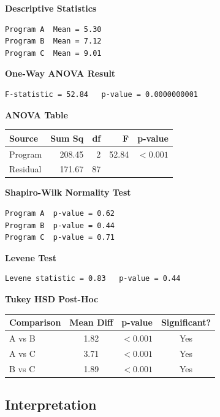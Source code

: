 \documentclass[12pt,a4paper]{article}
\begin{document}
\begin{outputbox}
\textbf{Descriptive Statistics}
\begin{verbatim}
Program A  Mean = 5.30
Program B  Mean = 7.12
Program C  Mean = 9.01
\end{verbatim}

\textbf{One-Way ANOVA Result}
\begin{verbatim}
F-statistic = 52.84   p-value = 0.0000000001
\end{verbatim}

\textbf{ANOVA Table}
\begin{center}
\begin{tabular}{lrrrr}
\toprule
Source   & Sum Sq & df & F     & p-value  \\
\midrule
Program  & 208.45 & 2  & 52.84 & $<0.001$ \\
Residual & 171.67 & 87 &       &          \\
\bottomrule
\end{tabular}
\end{center}

\textbf{Shapiro-Wilk Normality Test}
\begin{verbatim}
Program A  p-value = 0.62
Program B  p-value = 0.44
Program C  p-value = 0.71
\end{verbatim}

\textbf{Levene Test}
\begin{verbatim}
Levene statistic = 0.83   p-value = 0.44
\end{verbatim}

\textbf{Tukey HSD Post-Hoc}
\begin{center}
\begin{tabular}{lccc}
\toprule
Comparison & Mean Diff & p-value  & Significant? \\
\midrule
A vs B     & 1.82      & $<0.001$ & Yes          \\
A vs C     & 3.71      & $<0.001$ & Yes          \\
B vs C     & 1.89      & $<0.001$ & Yes          \\
\bottomrule
\end{tabular}
\end{center}
\end{outputbox}

\subsection{Interpretation}
\end{document}
